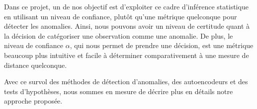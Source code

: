 Dans ce projet, un de nos objectif est d'exploiter ce cadre d'inférence statistique en utilisant un niveau de confiance, plutôt qu'une métrique quelconque pour détecter les anomalies. Ainsi, nous pouvons avoir un niveau de certitude quant à la décision de catégoriser une observation comme une anomalie. De plus, le niveau de confiance $\alpha$, qui nous permet de prendre une décision, est une métrique beaucoup plus intuitive et facile à déterminer comparativement à une mesure de distance quelconque. 

Avec ce survol des méthodes de détection d'anomalies, des autoencodeurs et des tests d'hypothèses, nous sommes en mesure de décrire plus en détails notre approche proposée.
